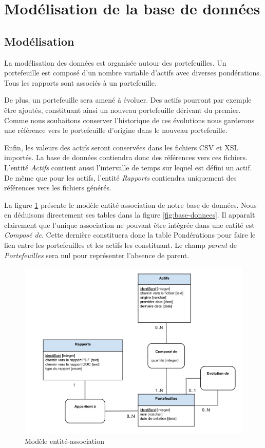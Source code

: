 \documentclass[a4paper,titlepage,french]{report}
\begin{document}
\section{Modélisation de la base de données}

\subsection{Modélisation}

La modélisation des données est organisée autour des portefeuilles.
Un portefeuille est composé d'un nombre variable d'actifs avec diverses pondérations.
Tous les rapports sont associés à un portefeuille.

De plus, un portefeuille sera amené à évoluer.
Des actifs pourront par exemple être ajoutés, constituant ainsi un nouveau portefeuille dérivant du premier.
Comme nous souhaitons conserver l'historique de ces évolutions nous garderons une référence vers le portefeuille d'origine dans le nouveau portefeuille.

Enfin, les valeurs des actifs seront conservées dans les fichiers CSV et XSL importés. 
La base de données contiendra donc des références vers ces fichiers.
L'entité \textit{Actifs} contient aussi l'intervalle de temps sur lequel est défini un actif.
De même que pour les actifs, l'entité \textit{Rapports} contiendra uniquement des références vers les fichiers générés.

La figure \ref{fig:modele-entite-association} présente le modèle entité-association de notre base de données.
Nous en déduisons directement ses tables dans la figure \ref{fig:base-donnees}.
Il apparaît clairement que l'unique association ne pouvant être intégrée dans une entité est \textit{Composé de}.
Cette dernière constituera donc la table Pondérations pour faire le lien entre les portefeuilles et les actifs les constituant.
Le champ \textit{parent} de \textit{Portefeuilles} sera nul pour représenter l'absence de parent.

\begin{figure}
  	\center
  	\includegraphics[width=1\textwidth]{modele-entite-association.png}
  	\caption{Modèle entité-association}
  	\label{fig:modele-entite-association}
\end{figure}
\end{document}
